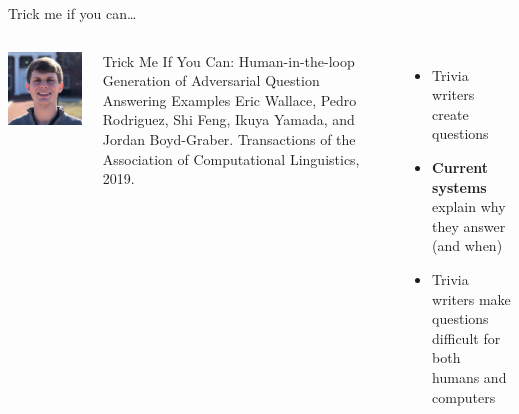 \documentclass[xcolor=dvipsnames,xcolor=table]{beamer}
\newcommand{\gfxq}[2]{
\begin{center}
	\texttt{[image: qb/\#1]}
\end{center}
}
\begin{document}
\begin{frame}{Trick me if you can\dots}

  \begin{columns}

    \includegraphics[width=.5\linewidth]{general_figures/eric}

    \begin{block}{ Trick Me If You Can: Human-in-the-loop Generation of Adversarial Question Answering Examples}
Eric Wallace, Pedro Rodriguez, Shi Feng, Ikuya Yamada, and Jordan Boyd-Graber. Transactions of the Association of Computational Linguistics, 2019. 

    \end{block}
    
  \begin{itemize}
  \item Trivia writers create questions
  \item {\bf Current systems} explain why they answer (and when)
  \item Trivia writers make questions difficult for both humans and computers
  \end{itemize}
  \end{columns}
\end{frame}



\end{document}
